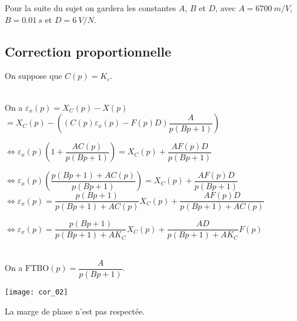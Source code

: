 \begin{multicols}{2}
Pour la suite du sujet on gardera les constantes $A$, $B$ et $D$, avec $A=\SI{6700}{m/V}$, $B=\SI{0,01}{s}$ et $D=\SI{6}{V/N}$.

\fi
\subsection*{Correction proportionnelle}

On suppose que $C(p)=K_c$. 


\ifprof
\begin{corrige}~\\
On a $\varepsilon_x(p)=X_C(p)-X(p)$ 
$ =X_C(p)-\left(\left(C(p)\varepsilon_x(p)-F(p)D \right)\dfrac{A}{p\left(Bp+1 \right)}  \right) $

$\Leftrightarrow \varepsilon_x(p) \left(1+ \dfrac{AC(p)}{p\left(Bp+1 \right)}\right)=X_C(p)+\dfrac{AF(p)D }{p\left(Bp+1 \right)}   $

$\Leftrightarrow \varepsilon_x(p) \left( \dfrac{p\left(Bp+1 \right)+AC(p)}{p\left(Bp+1 \right)}\right)=X_C(p)+\dfrac{AF(p)D }{p\left(Bp+1 \right)}   $
$\Leftrightarrow \varepsilon_x(p) =\dfrac{p\left(Bp+1 \right)}{p\left(Bp+1 \right)+AC(p)}X_C(p)+\dfrac{AF(p)D }{p\left(Bp+1 \right)+AC(p)}  $

$\Leftrightarrow \varepsilon_x(p) =\dfrac{p\left(Bp+1 \right)}{p\left(Bp+1 \right)+AK_C}X_C(p)+\dfrac{AD }{p\left(Bp+1 \right)+AK_C} F(p) $
\end{corrige}
\else
\fi


\ifprof
\begin{corrige}~\\
On a $\text{FTBO}(p)=\dfrac{A}{p\left(Bp+1\right)}$.
\begin{center}
\texttt{[image: cor\_02]}
\end{center}

La marge de phase n'est pas respectée. 

\end{corrige}
\else
\fi

\ifprof
\begin{corrige}~\\


\end{corrige}
\end{multicols}
